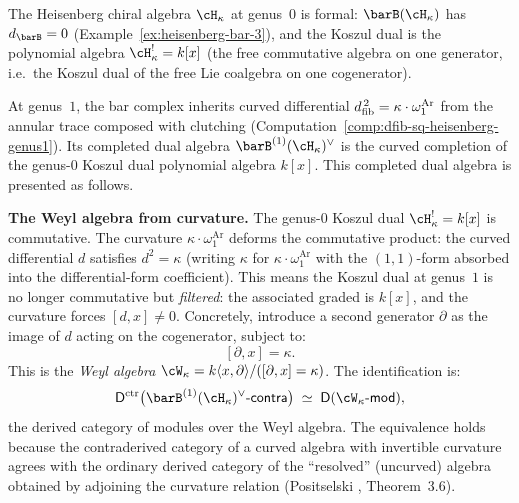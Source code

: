\begin{example}
\label{ex:heisenberg-curved-koszul}

The Heisenberg chiral algebra $\cH_\kappa$ at genus~$0$ is formal:
$\barB(\cH_\kappa)$ has $d_{\barB} = 0$
(Example~\ref{ex:heisenberg-bar-3}), and the Koszul dual is the
polynomial algebra $\cH_\kappa^! = k[x]$ (the free commutative
algebra on one generator, i.e.\ the Koszul dual of the free Lie
coalgebra on one cogenerator).

At genus~$1$, the bar complex inherits curved differential
$d_{\mathrm{fib}}^{\,2} = \kappa \cdot \omega_1^{\mathrm{Ar}}$ from the annular trace
composed with clutching
\textup{(}Computation~\ref{comp:dfib-sq-heisenberg-genus1}\textup{)}.
Its completed dual algebra $\barB^{(1)}(\cH_\kappa)^\vee$ is the
curved completion of the genus-$0$ Koszul dual polynomial algebra
$k[x]$. This completed dual algebra is presented as follows.

\smallskip\noindent
\textbf{The Weyl algebra from curvature.}
The genus-$0$ Koszul dual $\cH_\kappa^! = k[x]$ is commutative. The
curvature $\kappa \cdot \omega_1^{\mathrm{Ar}}$ deforms the commutative product:
the curved differential $d$ satisfies $d^2 = \kappa$
(writing $\kappa$ for $\kappa \cdot \omega_1^{\mathrm{Ar}}$ with the $(1,1)$-form
absorbed into the differential-form coefficient). This means the
Koszul dual at genus~$1$ is no longer commutative but
\emph{filtered}: the associated graded is $k[x]$, and the curvature
forces $[d, x] \neq 0$. Concretely, introduce a second generator
$\partial$ as the image of $d$ acting on the cogenerator, subject to:
\begin{equation}\label{eq:weyl-from-curvature}
 [\partial, x] = \kappa.
\end{equation}
This is the \emph{Weyl algebra} $\cW_\kappa = k\langle x,
\partial\rangle / ([\partial, x] = \kappa)$. The identification is:
\begin{equation}\label{eq:curved-koszul-heisenberg}
 \Dctr\bigl(\barB^{(1)}(\cH_\kappa)^\vee\text{-}\mathsf{contra}\bigr)
 \;\simeq\;
 \mathsf{D}(\cW_\kappa\text{-}\mathsf{mod}),
\end{equation}
the derived category of modules over the Weyl algebra. The
equivalence holds because the contraderived category of a
curved algebra with invertible curvature agrees with the
ordinary derived category of the ``resolved'' (uncurved) algebra
obtained by adjoining the curvature relation
(Positselski \cite{Pos11}, Theorem~3.6).


\end{example}
